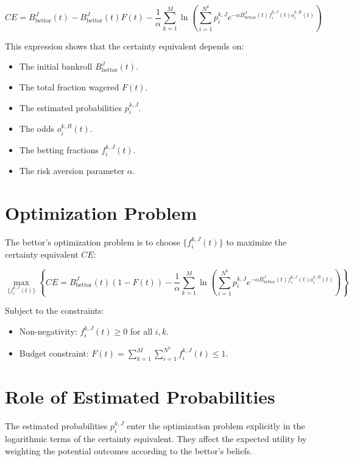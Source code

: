 \[
CE = B_{\text{bettor}}^J(t) - B_{\text{bettor}}^J(t) F(t) - \frac{1}{\alpha} \sum_{k=1}^M \ln\left( \sum_{i=1}^{N^k} p_i^{k,J} e^{ -\alpha B_{\text{bettor}}^J(t) f_i^{k,J}(t) o_i^{k,B}(t) } \right)
\]

This expression shows that the certainty equivalent depends on:

\begin{itemize}
    \item The initial bankroll \( B_{\text{bettor}}^J(t) \).
    \item The total fraction wagered \( F(t) \).
    \item The estimated probabilities \( p_i^{k,J} \).
    \item The odds \( o_i^{k,B}(t) \).
    \item The betting fractions \( f_i^{k,J}(t) \).
    \item The risk aversion parameter \( \alpha \).
\end{itemize}

\section{Optimization Problem}

The bettor's optimization problem is to choose \( \{ f_i^{k,J}(t) \} \) to maximize the certainty equivalent \( CE \):

\[
\max_{\{ f_i^{k,J}(t) \}} \left\{ CE = B_{\text{bettor}}^J(t) (1 - F(t)) - \frac{1}{\alpha} \sum_{k=1}^M \ln\left( \sum_{i=1}^{N^k} p_i^{k,J} e^{ -\alpha B_{\text{bettor}}^J(t) f_i^{k,J}(t) o_i^{k,B}(t) } \right) \right\}
\]

Subject to the constraints:

\begin{itemize}
    \item Non-negativity: \( f_i^{k,J}(t) \geq 0 \) for all \( i, k \).
    \item Budget constraint: \( F(t) = \sum_{k=1}^M \sum_{i=1}^{N^k} f_i^{k,J}(t) \leq 1 \).
\end{itemize}

\section{Role of Estimated Probabilities}

The estimated probabilities \( p_i^{k,J} \) enter the optimization problem explicitly in the logarithmic terms of the certainty equivalent. They affect the expected utility by weighting the potential outcomes according to the bettor's beliefs.

